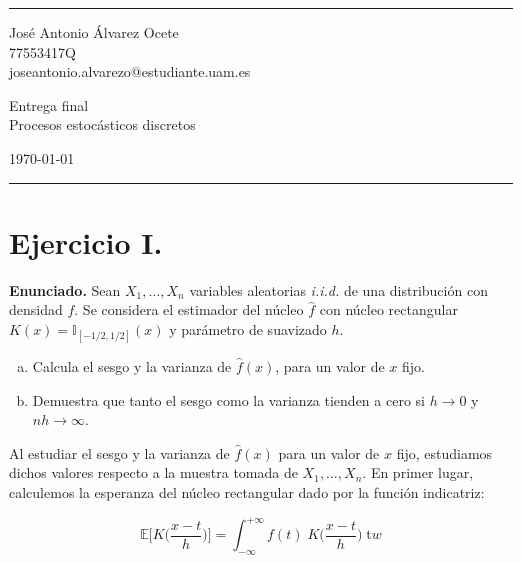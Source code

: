 \documentclass[a4paper]{article}
\newcommand{\E}{\mathbb{E}}
\newcommand{\I}{\mathbb{I}}
\begin{document}
	

\fancyhead[C]{}
\hrule \medskip %
\begin{minipage}{0.295\textwidth} 
	\raggedright
	\footnotesize
	José Antonio Álvarez Ocete \hfill\\   
	77553417Q \hfill\\
	joseantonio.alvarezo@estudiante.uam.es
\end{minipage}
\begin{minipage}{0.4\textwidth} 
	\centering 
	\large 
	Entrega final\\ 
	\normalsize 
	Procesos estocásticos discretos\\ 
\end{minipage}
\begin{minipage}{0.295\textwidth} 
	\raggedleft
	\today\hfill\\
\end{minipage}
\medskip\hrule 
\bigskip


\section*{Ejercicio I.}

\textbf{Enunciado.} Sean $X_1, \ldots, X_n$ variables aleatorias \emph{i.i.d.} de una distribución con densidad $f$. Se considera el estimador del núcleo $\hat f$ con núcleo rectangular $K(x) = \I_{[-1/2,1/2]}(x)$ y parámetro de suavizado $h$.

\begin{enumerate}[a)]
	\item Calcula el sesgo y la varianza de $\hat f(x)$, para un valor de $x$ fijo.
	
	\item Demuestra que tanto el sesgo como la varianza tienden a cero si $h \rightarrow 0$ y $nh \rightarrow \infty$.
\end{enumerate}

Al estudiar el sesgo y la varianza de $\hat f(x)$ para un valor de $x$ fijo, estudiamos dichos valores respecto a la muestra tomada de  $X_1, \ldots, X_n$. En primer lugar, calculemos la esperanza del núcleo rectangular dado por la función indicatriz:

\[
	\E \bigg[ K\bigg(\frac{x - t}{h}\bigg) \bigg] = \int_{-\infty}^{+\infty} f(t) \; K\bigg(\frac{x - t}{h}\bigg) \; \text{t}w 
\]
\end{document}
